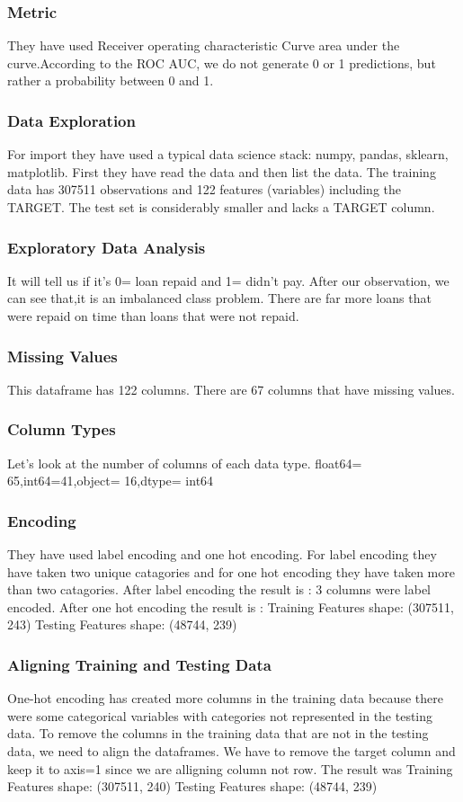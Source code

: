 \documentclass[twoside,a4paper]{article}
\begin{document}
\subsubsection{Metric}
They have used Receiver operating characteristic Curve area under the curve.According to the ROC AUC, we do not generate 0 or 1 predictions, but rather a probability between 0 and 1. 
\subsubsection{Data Exploration}
For import they have used a typical data science stack: numpy, pandas, sklearn, matplotlib.
First they have read the data and then list the data. The training data has 307511 observations and 122 features (variables) including the TARGET.
The test set is considerably smaller and lacks a TARGET column.
\subsubsection{Exploratory Data Analysis}
It will tell us if it's 0= loan repaid and 1= didn't pay. After our observation, we can see that,it is an imbalanced class problem. There are far more loans that were repaid on time than loans that were not repaid.
\subsubsection{Missing Values}
This dataframe has 122 columns.
There are 67 columns that have missing values.
\subsubsection{Column Types}
Let's look at the number of columns of each data type.  float64= 65,int64=41,object= 16,dtype= int64
\subsubsection{Encoding}
They have used label encoding and one hot encoding. For label encoding they have taken two unique catagories and for one hot encoding they have taken more than two catagories.
After label encoding the result is : 3 columns were label encoded.
After one hot encoding the result is : Training Features shape:  (307511, 243) Testing Features shape:  (48744, 239)
\subsubsection{Aligning Training and Testing Data}
One-hot encoding has created more columns in the training data because there were some categorical variables with categories not represented in the testing data. To remove the columns in the training data that are not in the testing data, we need to align the dataframes. We have to remove the target column and keep it to axis=1 since we are alligning column not row.
The result was 
Training Features shape:  (307511, 240)
Testing Features shape:  (48744, 239)
\end{document}
